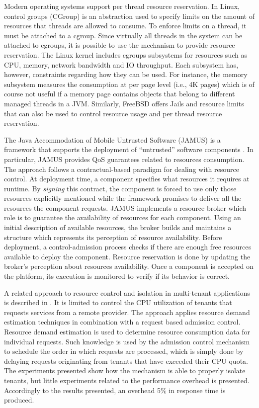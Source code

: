 Modern operating systems support per thread resource reservation.
In Linux, control groups (CGroup) \cite{Soltesz:2007:COS:1272998.1273025} is an abstraction used to specify limits on the amount of resources that threads are allowed to consume.
To enforce limits on a thread, it must be attached to a cgroup.
Since virtually all threads in the system can be attached to cgroups, it is possible to use the mechanism
to provide resource reservation.
The Linux kernel includes cgroups subsystems for resources such as CPU, memory, network bandwidth and IO throughput.
Each subsystem has, however, constraints regarding how they can be used.
For instance, the memory subsystem measures the consumption at per page level (i.e., 4K pages) which is of course not useful if a memory page contains objects that belong to different managed threads in a JVM. 
Similarly, FreeBSD offers Jails \cite{Kamp00jails:confining} and resource limits that can also be used to control resource usage and per thread resource reservation.

The Java Accommodation of Mobile Untrusted Software (JAMUS) is a framework that supports the deployment of ``untrusted'' software components \cite{JAMUS2002}.
In particular, JAMUS provides QoS guarantees related to resources consumption. 
The approach follows a contractual-based paradigm for dealing with resource control.
At deployment time, a component specifies what resources it requires at runtime.
By \textit{signing} this contract, the component is forced to use only those resources explicitly mentioned while the framework promises to deliver all the resources the component requests.
JAMUS implements a resource broker which role is to guarantee the availability of resources for each component.
Using an initial description of available resources, the broker builds and maintains a structure which represents its perception of resource availability.
Before deployment, a control-admission process checks if there are enough free resources available to deploy the component.
Resource reservation is done by updating the broker's perception about resources availability.
Once a component is accepted on the platform, its execution is monitored to verify if its behavior is correct.

A related approach to resource control and isolation in multi-tenant applications is described in \cite{KrSpAhKo2014_CCGrid_ResourceIsolation}.
It is limited to control the CPU utilization of tenants that requests services from a remote provider.
The approach applies resource demand estimation techniques in combination with a request based admission control.
Resource demand estimation is used to determine resource consumption data for individual requests.
Such knowledge is used by the admission control mechanism to schedule the order in which requests are processed, which is simply done by delaying requests originating from tenants that have exceeded their CPU quota.
The experiments presented show how the mechanism is able to properly isolate tenants, but little experiments related to the performance overhead is presented.
Accordingly to the results presented, an overhead 5\% in response time is produced.

